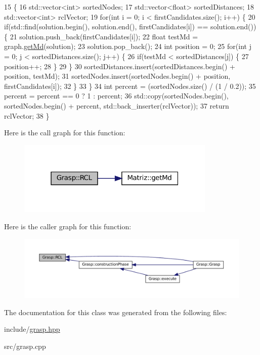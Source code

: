 \begin{DoxyCode}
15                                                                                   \{
16    std::vector<int> sortedNodes;
17    std::vector<float> sortedDistances;
18    std::vector<int> rclVector;
19    \textcolor{keywordflow}{for}(\textcolor{keywordtype}{int} i = 0; i < firstCandidates.size(); i++) \{
20      \textcolor{keywordflow}{if}(std::find(solution.begin(), solution.end(), firstCandidates[i]) == solution.end()) \{
21        solution.push\_back(firstCandidates[i]);
22        \textcolor{keywordtype}{float} testMd = graph.\hyperlink{classMatriz_a8df14a27d791f24206dd633b2a685c5b}{getMd}(solution);
23        solution.pop\_back();
24        \textcolor{keywordtype}{int} position = 0;
25        \textcolor{keywordflow}{for}(\textcolor{keywordtype}{int} j = 0; j < sortedDistances.size(); j++) \{
26          \textcolor{keywordflow}{if}(testMd < sortedDistances[j]) \{
27            position++;
28          \}
29        \}
30        sortedDistances.insert(sortedDistances.begin() + position, testMd);
31        sortedNodes.insert(sortedNodes.begin() + position, firstCandidates[i]);
32      \}
33    \}
34    \textcolor{keywordtype}{int} percent = (sortedNodes.size() / (1 / 0.2));
35    percent = percent == 0 ? 1 : percent;
36    std::copy(sortedNodes.begin(), sortedNodes.begin() + percent, std::back\_inserter(rclVector));
37    \textcolor{keywordflow}{return} rclVector;
38  \}
\end{DoxyCode}
Here is the call graph for this function\+:\nopagebreak
\begin{figure}[H]
\begin{center}
\leavevmode
\includegraphics[width=268pt]{classGrasp_ac63d4a1892472663549c77686edfed74_cgraph}
\end{center}
\end{figure}
Here is the caller graph for this function\+:\nopagebreak
\begin{figure}[H]
\begin{center}
\leavevmode
\includegraphics[width=350pt]{classGrasp_ac63d4a1892472663549c77686edfed74_icgraph}
\end{center}
\end{figure}


The documentation for this class was generated from the following files\+:\begin{DoxyCompactItemize}
\item 
include/\hyperlink{grasp_8hpp}{grasp.\+hpp}\item 
src/grasp.\+cpp\end{DoxyCompactItemize}
